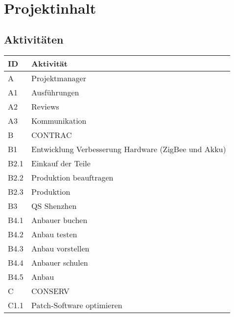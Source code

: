 \section{Projektinhalt}
\subsection{Aktivitäten}
\begin{table}[H]
    \renewcommand{\arraystretch}{1.05}
    \begin{center}
        \begin{tabular}{l|l}
            \hline
            \textbf{ID} & \textbf{Aktivität}\\\hline
            A    & Projektmanager                                      \\ \hline
            A1   & Ausführungen                                        \\ \hline
            A2   & Reviews                                             \\ \hline
            A3 & Kommunikation \\\hline
            B    & CONTRAC                                             \\ \hline
            B1   & Entwicklung Verbesserung Hardware (ZigBee und Akku) \\ \hline
            B2.1 & Einkauf der Teile\\\hline
            B2.2 & Produktion beauftragen                              \\ \hline
            B2.3 & Produktion                                          \\ \hline
            B3 & QS Shenzhen                                         \\ \hline
            B4.1 & Anbauer buchen                                      \\ \hline
            B4.2 & Anbau testen                                        \\ \hline
            B4.3 & Anbau vorstellen                                    \\ \hline
            B4.4 & Anbauer schulen                                     \\ \hline
            B4.5 & Anbau                                               \\ \hline
            C    & CONSERV                                             \\ \hline
            C1.1 & Patch-Software optimieren                           \\ \hline

\end{tabular}
\end{center}
\end{table}

